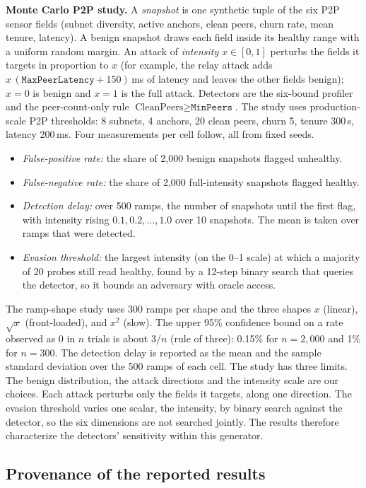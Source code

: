 \textbf{Monte Carlo P2P study.} A \emph{snapshot} is one synthetic tuple of
the six P2P sensor fields (subnet diversity, active anchors, clean peers,
churn rate, mean tenure, latency). A benign snapshot draws each field inside its healthy range
with a uniform random margin. An attack of \emph{intensity}
$x\in[0,1]$ perturbs the fields it targets in proportion to $x$ (for
example, the relay attack adds $x\,(\texttt{MaxPeerLatency}{+}150)$\,ms of
latency and leaves the other fields benign); $x=0$ is benign and $x=1$ is
the full attack. Detectors are the six-bound profiler and the
peer-count-only rule $\text{CleanPeers}\ge\texttt{MinPeers}$. The study uses
production-scale P2P thresholds: 8 subnets, 4 anchors, 20 clean peers, churn
5, tenure 300\,s, latency 200\,ms. Four measurements per cell follow, all
from fixed seeds.
\begin{itemize}
  \item \emph{False-positive rate:} the share of 2{,}000 benign snapshots
  flagged unhealthy.
  \item \emph{False-negative rate:} the share of 2{,}000 full-intensity
  snapshots flagged healthy.
  \item \emph{Detection delay:} over 500 ramps, the number of snapshots until
  the first flag, with intensity rising $0.1,0.2,\ldots,1.0$ over 10
  snapshots. The mean is taken over ramps that were detected.
  \item \emph{Evasion threshold:} the largest intensity (on the 0--1 scale)
  at which a majority of 20 probes still read healthy, found by a 12-step
  binary search that queries the detector, so it bounds an adversary with
  oracle access.
\end{itemize}
The ramp-shape study uses 300 ramps per shape and the three shapes
$x$ (linear), $\sqrt{x}$ (front-loaded), and $x^2$ (slow). The upper 95\% confidence bound on a
rate observed as 0 in $n$ trials is about $3/n$ (rule of three): 0.15\% for
$n=2{,}000$ and 1\% for $n=300$.
The detection delay is reported as the mean and the sample standard
deviation over the 500 ramps of each cell.
The study has three limits. The benign distribution, the attack directions and
the intensity scale are our choices. Each attack perturbs only the fields it
targets, along one direction. The evasion threshold varies one scalar, the
intensity, by binary search against the detector, so the six dimensions are not
searched jointly. The results therefore characterize the detectors' sensitivity
within this generator.


\subsection*{Provenance of the reported results}
\label{subsec:provenance}

